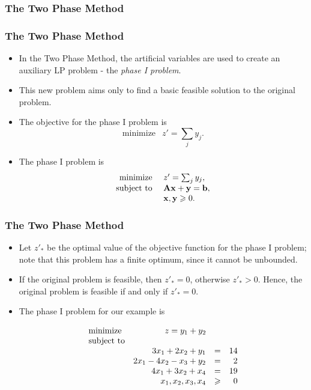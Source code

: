 \documentclass{beamer}
\theoremstyle{plain}
\newcommand{\git}[1]{\textcolor{grena}{\it #1}}
\let\ge\geqslant
\def\x{{\mathrm x}}
\def\y{{\mathrm y}}
\def\AA{{\bf \mathrm\bf A}}
\def\bb{{\bf \mathrm \bf b}}
\def\x{{\mathbf x}}
\def\y{{\mathbf y}}
\begin{document}
\subsubsection{The Two Phase Method}
\begin{frame}\frametitle{The Two Phase Method}
\justifying

\begin{itemize}
\justifying

\item In the Two Phase Method, the artificial variables are used to create an auxiliary LP problem - the \git{phase I problem}.

\item This new problem aims only to find a basic feasible solution to the original problem.

\item The objective for the phase I problem is
\[ \textrm{minimize } \: \:  z' = \sum_j y_j. \]

\item The phase I problem is
\begin{equation}
\label{eq17}
\begin{array}{rl}
\textrm{minimize } & z' = \sum_jy_j, \\
\textrm{subject to } & \AA\x + \y = \bb,\\
& \x, \y \ge 0. \end{array}
\end{equation}

\end{itemize}

\end{frame}

\begin{frame}\frametitle{The Two Phase Method}
\justifying

\begin{itemize}
\justifying

\item Let $ z'_* $ be the optimal value of the objective function for the phase I problem; note that this problem has a finite optimum, since it cannot be unbounded.

\item If the original problem is feasible, then $ z'_* = 0 $, otherwise $ z'_* > 0 $. Hence, the original problem is feasible if and only if $ z'_* = 0 $.

\item The phase I problem for our example is

\[ \begin{array}{lrcr}
\textrm{minimize} & \multicolumn{3}{c}{z = y_1 + y_2}  \\
\textrm{subject to} & \\
& 3x_1 + 2x_2 + y_1& = & 14 \\
& 2x_1 - 4x_2 - x_3 + y_2 & = & 2 \\
& 4x_1 + 3x_2 + x_4 & = & 19 \\
& x_1, x_2, x_3, x_4 & \ge & 0
\end{array}
\]

\end{itemize}

\end{frame}
\end{document}
